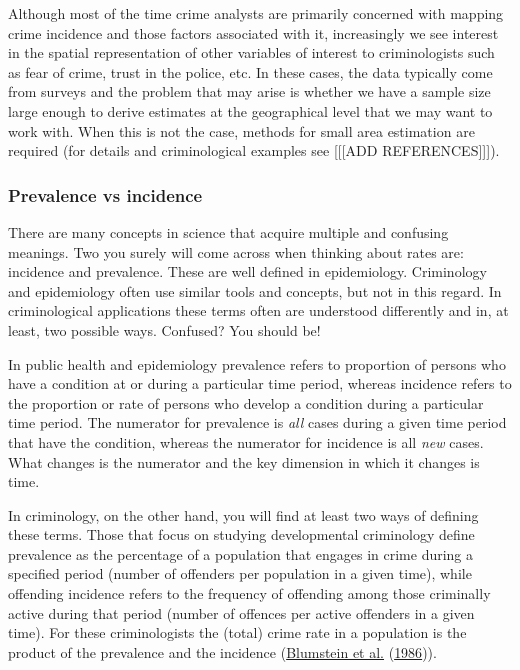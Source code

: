 \documentclass[
]{book}
\begin{document}
Although most of the time crime analysts are primarily concerned with mapping crime incidence and those factors associated with it, increasingly we see interest in the spatial representation of other variables of interest to criminologists such as fear of crime, trust in the police, etc. In these cases, the data typically come from surveys and the problem that may arise is whether we have a sample size large enough to derive estimates at the geographical level that we may want to work with. When this is not the case, methods for small area estimation are required (for details and criminological examples see {[}{[}{[}ADD REFERENCES{]}{]}{]}).

\hypertarget{prevalence-vs-incidence}{%
\subsubsection{Prevalence vs incidence}\label{prevalence-vs-incidence}}

There are many concepts in science that acquire multiple and confusing meanings. Two you surely will come across when thinking about rates are: incidence and prevalence. These are well defined in epidemiology. Criminology and epidemiology often use similar tools and concepts, but not in this regard. In criminological applications these terms often are understood differently and in, at least, two possible ways. Confused? You should be!

In public health and epidemiology prevalence refers to proportion of persons who have a condition at or during a particular time period, whereas incidence refers to the proportion or rate of persons who develop a condition during a particular time period. The numerator for prevalence is \emph{all} cases during a given time period that have the condition, whereas the numerator for incidence is all \emph{new} cases. What changes is the numerator and the key dimension in which it changes is time.

In criminology, on the other hand, you will find at least two ways of defining these terms. Those that focus on studying developmental criminology define prevalence as the percentage of a population that engages in crime during a specified period (number of offenders per population in a given time), while offending incidence refers to the frequency of offending among those criminally active during that period (number of offences per active offenders in a given time). For these criminologists the (total) crime rate in a population is the product of the prevalence and the incidence (\protect\hyperlink{ref-Blumstein_1986}{Blumstein et al.} (\protect\hyperlink{ref-Blumstein_1986}{1986})).
\end{document}
